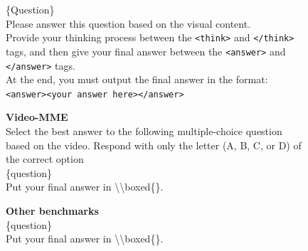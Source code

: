 \documentclass{llmxive}
\providecommand{\ours}{VideoKR\xspace}
\begin{document}
\begin{figure}[h]
\begin{tcolorbox}[colback=black!7.5!white, colframe=black!80!white, title=All Benchmarks -- For \ours and OneThinker, fontupper=\footnotesize, fontlower=\footnotesize, fonttitle=\footnotesize]

\{Question\}\\
Please answer this question based on the visual content.\\
Provide your thinking process between the \texttt{<think>} and \texttt{</think>} tags, and then give your final answer between the \texttt{<answer>} and \texttt{</answer>} tags.\\
At the end, you must output the final answer in the format:\\
\texttt{<answer>}\texttt{<your answer here>}\texttt{</answer>}
\end{tcolorbox}

\end{figure}

\begin{figure}[h]
\begin{tcolorbox}[colback=black!7.5!white, colframe=black!80!white, title=All Benchmarks -- For VideoAuto-R1, fontupper=\footnotesize, fontlower=\footnotesize, fonttitle=\footnotesize]

\textbf{Video-MME}\\
Select the best answer to the following multiple-choice question based on the video. Respond with only the letter (A, B, C, or D)
of the correct option\\
\{question\}\\
Put your final answer in \textbackslash\textbackslash boxed\{\}.

\tcblower
\textbf{Other benchmarks}\\
\{question\}\\
Put your final answer in \textbackslash\textbackslash boxed\{\}.

\end{tcolorbox}
\end{figure}
\end{document}
